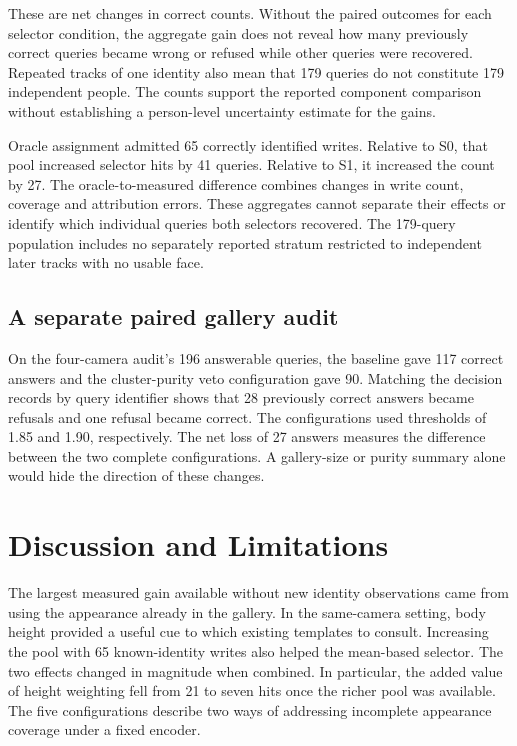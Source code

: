 \documentclass[journal,letterpaper]{IEEEtran}
\begin{document}
These are net changes in correct counts. Without the paired outcomes for each selector condition, the aggregate gain does not reveal how many previously correct queries became wrong or refused while other queries were recovered. Repeated tracks of one identity also mean that 179 queries do not constitute 179 independent people. The counts support the reported component comparison without establishing a person-level uncertainty estimate for the gains.

Oracle assignment admitted 65 correctly identified writes. Relative to S0, that pool increased selector hits by 41 queries. Relative to S1, it increased the count by 27. The oracle-to-measured difference combines changes in write count, coverage and attribution errors. These aggregates cannot separate their effects or identify which individual queries both selectors recovered. The 179-query population includes no separately reported stratum restricted to independent later tracks with no usable face.

\subsection{A separate paired gallery audit}
On the four-camera audit's 196 answerable queries, the baseline gave 117 correct answers and the cluster-purity veto configuration gave 90. Matching the decision records by query identifier shows that 28 previously correct answers became refusals and one refusal became correct. The configurations used thresholds of 1.85 and 1.90, respectively. The net loss of 27 answers measures the difference between the two complete configurations. A gallery-size or purity summary alone would hide the direction of these changes.

\section{Discussion and Limitations}\label{sec:discussion}
The largest measured gain available without new identity observations came from using the appearance already in the gallery. In the same-camera setting, body height provided a useful cue to which existing templates to consult. Increasing the pool with 65 known-identity writes also helped the mean-based selector. The two effects changed in magnitude when combined. In particular, the added value of height weighting fell from 21 to seven hits once the richer pool was available. The five configurations describe two ways of addressing incomplete appearance coverage under a fixed encoder.
\end{document}
